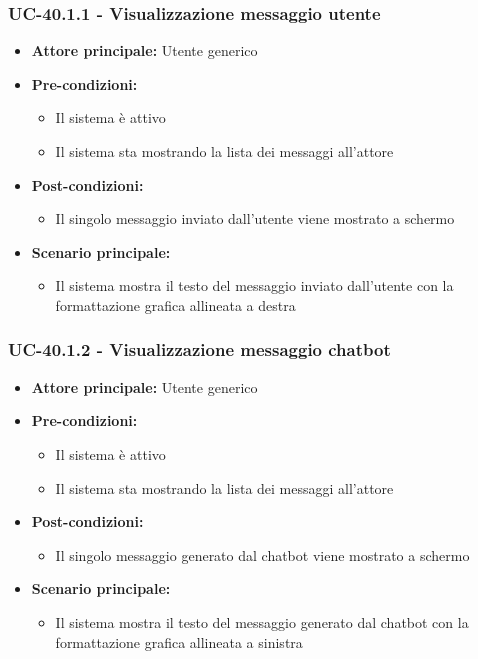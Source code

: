 \documentclass[a4paper,12pt]{article}
\begin{document}
\subsubsection{UC-40.1.1 - Visualizzazione messaggio utente} \label{subsec:UC-40.1.1}
\begin{itemize}
    \item \textbf{Attore principale:} Utente generico
    \item \textbf{Pre-condizioni:} 
    \begin{itemize}
        \item Il sistema è attivo
        \item Il sistema sta mostrando la lista dei messaggi all'attore
    \end{itemize}
    \item \textbf{Post-condizioni:}
    \begin{itemize}
        \item Il singolo messaggio inviato dall'utente viene mostrato a schermo
    \end{itemize}
    \item \textbf{Scenario principale:} 
    \begin{itemize}
        \item Il sistema mostra il testo del messaggio inviato dall'utente con la formattazione grafica allineata a destra
    \end{itemize}
\end{itemize}

\subsubsection{UC-40.1.2 - Visualizzazione messaggio chatbot} \label{subsec:UC-40.1.2}
\begin{itemize}
    \item \textbf{Attore principale:} Utente generico
    \item \textbf{Pre-condizioni:} 
    \begin{itemize}
        \item Il sistema è attivo
        \item Il sistema sta mostrando la lista dei messaggi all'attore
    \end{itemize}
    \item \textbf{Post-condizioni:}
    \begin{itemize}
        \item Il singolo messaggio generato dal chatbot viene mostrato a schermo
    \end{itemize}
    \item \textbf{Scenario principale:} 
    \begin{itemize}
        \item Il sistema mostra il testo del messaggio generato dal chatbot con la formattazione grafica allineata a sinistra
    \end{itemize}
\end{itemize}
\end{document}
